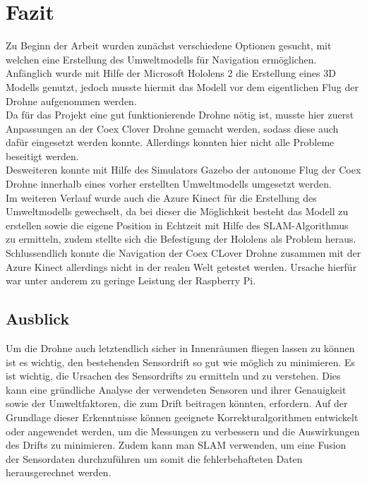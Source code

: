 \chapter{Fazit}
Zu Beginn der Arbeit wurden zunächst verschiedene Optionen gesucht, mit welchen eine Erstellung des Umweltmodells für Navigation ermöglichen. Anfänglich wurde mit Hilfe der Microsoft Hololens 2 die Erstellung eines 3D Modells genutzt, jedoch musste hiermit das Modell vor dem eigentlichen Flug der Drohne aufgenommen werden. \\
Da für das Projekt eine gut funktionierende Drohne nötig ist, musste hier zuerst Anpassungen an der Coex Clover Drohne gemacht werden, sodass diese auch dafür eingesetzt werden konnte. Allerdings konnten hier nicht alle Probleme beseitigt werden.\\ 
Desweiteren konnte mit Hilfe des Simulators Gazebo der autonome Flug der Coex Drohne innerhalb eines vorher erstellten Umweltmodells umgesetzt werden. \\
Im weiteren Verlauf wurde auch die Azure Kinect für die Erstellung des Umweltmodells gewechselt, da bei dieser die Möglichkeit besteht das Modell zu erstellen sowie die eigene Position in Echtzeit mit Hilfe des SLAM-Algorithmus zu ermitteln, zudem stellte sich die Befestigung der Hololens als Problem heraus. \\ 
Schlussendlich konnte die Navigation der Coex CLover Drohne zusammen mit der Azure Kinect allerdings nicht in der realen Welt getestet werden. Ursache hierfür war unter anderem zu geringe Leistung der Raspberry Pi.



\section{Ausblick}
Um die Drohne auch letztendlich sicher in Innenräumen fliegen lassen zu können ist es wichtig, den bestehenden Sensordrift so gut wie möglich zu minimieren. Es ist wichtig, die Ursachen des Sensordrifts zu ermitteln und zu verstehen. Dies kann eine gründliche Analyse der verwendeten Sensoren und ihrer Genauigkeit sowie der Umweltfaktoren, die zum Drift beitragen könnten, erfordern. Auf der Grundlage dieser Erkenntnisse können geeignete Korrekturalgorithmen entwickelt oder angewendet werden, um die Messungen zu verbessern und die Auswirkungen des Drifts zu minimieren. Zudem kann man SLAM verwenden, um eine Fusion der Sensordaten durchzuführen um somit die fehlerbehafteten Daten herausgerechnet werden. 

